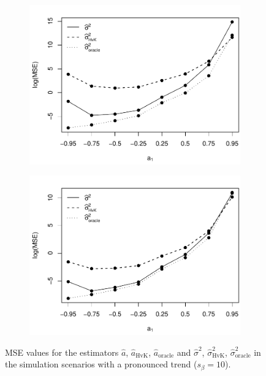 \begin{figure}[t!]
\begin{subfigure}[b]{0.475\textwidth}
\includegraphics[width=\textwidth]{Plots/MSE_lrv_T=250_slope=100_(L1,L2,K1,K2,M1,M2)=(25,25,5,10,20,30).pdf}
\end{subfigure}\hspace{0.25cm}
\begin{subfigure}[b]{0.475\textwidth}
\includegraphics[width=\textwidth]{Plots/MSE_lrv_T=500_slope=100_(L1,L2,K1,K2,M1,M2)=(25,25,5,10,20,30).pdf}
\end{subfigure}
\caption{MSE values for the estimators $\widehat{a}$, $\widehat{a}_{\text{HvK}}$, $\widehat{a}_{\text{oracle}}$ and $\widehat{\sigma}^2$, $\widehat{\sigma}^2_{\text{HvK}}$, $\widehat{\sigma}^2_{\text{oracle}}$ in the simulation scenarios with a pronounced trend ($s_\beta=10$).}\label{fig:MSE_slope10}
\end{figure}


